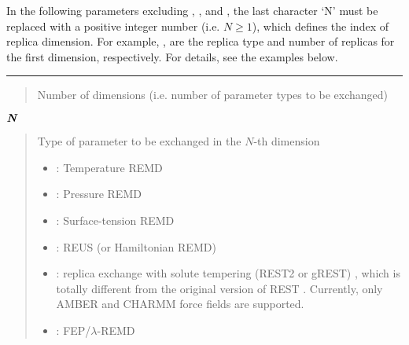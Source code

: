 \documentclass[a4paper,11pt,oneside,english]{sphinxmanual}
\begin{document}
In the following parameters excluding , ,
and , the last character ‘N’ must be replaced with a positive
integer number (i.e. \(N \geq 1\)), which defines the index of
replica dimension. For example, ,  are the replica type
and number of replicas for the first dimension, respectively.
For details, see the examples below.


\bigskip\hrule\bigskip


 
\begin{quote}


Number of dimensions (i.e. number of parameter types to be exchanged)
\end{quote}

\(\textbf{\textit{N}}\) 
\begin{quote}


Type of parameter to be exchanged in the \(N\)-th dimension
\begin{itemize}
\item {} 
: Temperature REMD 

\item {} 
: Pressure REMD 

\item {} 
: Surface-tension REMD 

\item {} 
: REUS (or Hamiltonian REMD)  

\item {} 
: replica exchange with solute tempering (REST2 or gREST)  , which is totally different from the original version of REST . Currently, only AMBER and CHARMM force fields are supported.

\item {} 
: FEP/\(\lambda\)-REMD 

\end{itemize}
\end{quote}
\end{document}
